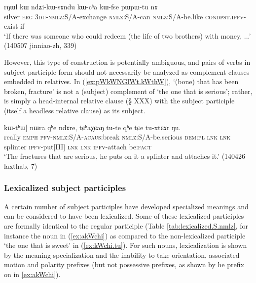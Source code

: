 \begin{exe}
\ex \label{ex:ndZikWsAndu}
\gll  rŋɯl kɯ ndʑi-kɯ-sɤndu kɯ-cʰa kɯ-fse pɯ\redp{}pɯ-tu nɤ  \\
silver \textsc{erg} \textsc{3du-nmlz}:S/A-exchange \textsc{nmlz}:S/A-can \textsc{nmlz}:S/A-be.like 
\textsc{cond}\redp{}\textsc{pst.ipfv}-exist if \\
\glt `If there was someone who could redeem (the life of two brothers) with money, ...' (140507 jinniao-zh, 339)
\end{exe}
 
However, this type of construction is potentially ambiguous, and pairs of verbs in subject participle form should not necessarily be analyzed as complement clauses embedded in relatives. In (\ref{ex:pWkWNGlWt.kWthW}),  `(bone) that has been broken, fracture' is not a (subject) complement of   `the one that is serious'; rather,  is simply a head-internal relative clause (§ XXX) with the subject participle (itself a headless relative clause)  as its subject. 

\begin{exe}
\ex \label{ex:pWkWNGlWt.kWthW}
\gll  [wuma ʑo [pɯ-kɯ-ɴɢlɯt] kɯ-tʰɯ] nɯra qʰe ndɤre, tɕʰaχɕaŋ tu-te qʰe tɕe tu-xtɕɤr ŋu.  \\
really \textsc{emph} \textsc{pfv}-\textsc{nmlz}:S/A-\textsc{acaus}:break \textsc{nmlz}:S/A-be.serious \textsc{dem}:\textsc{pl} \textsc{lnk}   \textsc{lnk} splinter \textsc{ipfv}-put[III]   \textsc{lnk}  \textsc{lnk} \textsc{ipfv}-attach be:\textsc{fact} \\
\glt `The fractures that are serious, he puts on it a splinter and attaches it.' (140426 laxthab, 7)
\end{exe}

\subsubsection{Lexicalized subject participles} \label{sec:lexicalized.subject.participle}
A certain number of subject participles have developed specialized meanings and can be considered to have been lexicalized. Some of these lexicalized participles are formally identical to the regular participle (Table  \ref{tab:lexicalized.S.nmlz}, for instance the noun  in (\ref{ex:akWchi})  as compared to the non-lexicalized participle  `the one that is sweet' in (\ref{ex:kWchi.tu}). For such nouns, lexicalization is shown by the meaning specialization and the inability to take orientation, associated motion and polarity prefixes (but not possessive prefixes, as shown by he prefix  on  in \ref{ex:akWchi}).

